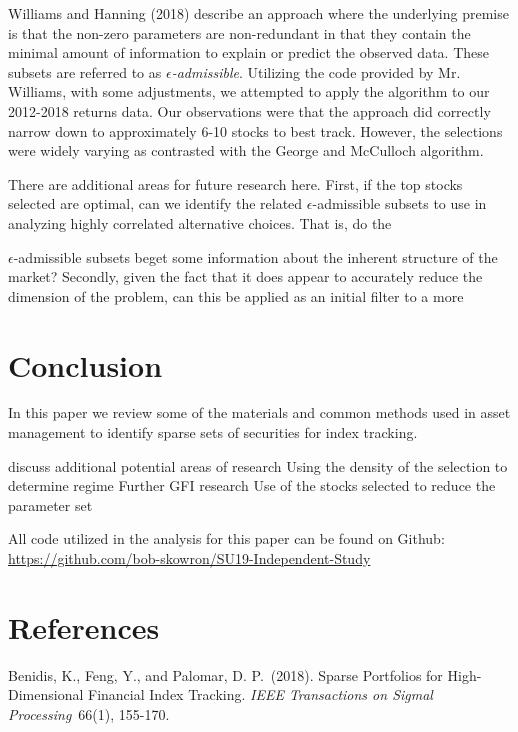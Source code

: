 \documentclass[a4paper, 12pt]{article}
\theoremstyle{plain}
\theoremstyle{definition}
\theoremstyle{remark}
\begin{document}
Williams and Hanning (2018) describe an approach where the underlying premise is that the non-zero parameters are non-redundant in that they contain the minimal amount of information to explain or predict the observed data. These subsets are referred to as \textit{$\epsilon$-admissible}. Utilizing the code provided by Mr. Williams, with some adjustments, we attempted to apply the algorithm to our 2012-2018 returns data. Our observations were that the approach did correctly narrow down to approximately 6-10 stocks to best track. However, the selections were widely varying as contrasted with the George and McCulloch algorithm.

There are additional areas for future research here. First, if the top stocks selected are optimal, can we identify the related $\epsilon$-admissible subsets to use in analyzing highly correlated alternative choices. That is, do the {$\epsilon$-admissible subsets beget some information about the inherent structure of the market? Secondly, given the fact that it does appear to accurately reduce the dimension of the problem, can this be applied as an initial filter to a more 

\section{Conclusion}

In this paper we review some of the materials and common methods used in asset management to identify sparse sets of securities for index tracking. 

{\color{red} discuss additional potential areas of research}
Using the density of the selection to determine regime
Further GFI research
Use of the stocks selected to reduce the parameter set

All code utilized in the analysis for this paper can be found on Github: \href{https://github.com/bob-skowron/SU19-Independent-Study}{https://github.com/bob-skowron/SU19-Independent-Study}

\section*{References}

\begin{description}

\item{} Benidis, K., Feng, Y., and Palomar, D. P.~(2018). Sparse Portfolios for High-Dimensional Financial Index Tracking. \emph{IEEE Transactions on Sigmal Processing}~66(1), 155-170.


\end{description}}
\end{document}
